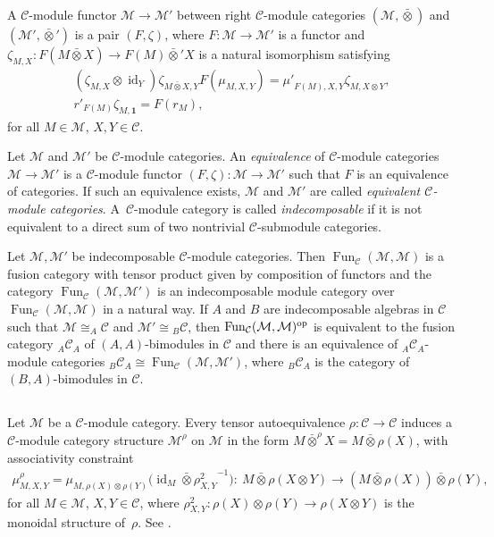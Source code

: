 \documentclass[pdftex]{sigma}
\numberwithin{equation}{section}
\newcommand{\oot}{\bar\otimes}
\newcommand{\C}{{\mathcal C}}
\newcommand{\M}{{\mathcal M}}
\newcommand{\1}{\textbf{1}}
\newcommand\id{\operatorname{id}}
\begin{document}
A $\C$-module functor $\M \to \M'$ between right $\C$-module categories $(\M, \oot)$ and $(\M', \oot')$ is a pair $(F, \zeta)$, where $F\colon \M\to \M'$ is a functor and $\zeta_{M, X}\colon F(M \oot X) \to F(M) \oot' X$ is a natural isomorphism satisfying
\begin{gather}\label{uno-z} (\zeta_{M, X} \otimes \id_Y ) \zeta_{M \oot X, Y} F(\mu_{M, X, Y}) = {\mu'}_{F(M), X, Y} \zeta_{M, X \otimes Y},\\
\label{dos-z} {r'}_{F(M)} \zeta_{M, \1} = F(r_M),
\end{gather}
for all $M \in \M$, $X, Y \in \C$.

Let $\M$ and $\M'$ be $\C$-module categories. An \emph{equivalence} of $\C$-module categories $\M \to \M'$ is a $\C$-module functor $(F, \zeta)\colon \M\to \M'$ such that $F$ is an equivalence of categories. If such an equivalence exists, $\M$ and $\M'$ are called \emph{equivalent $\C$-module categories}. A~$\C$-module category is called \emph{indecomposable} if it is not equivalent to a direct sum of two nontrivial $\mathcal{C}$-submodule categories.

Let $\M, \M'$ be indecomposable $\C$-module categories. Then $\operatorname{Fun}_\C(\M, \M)$ is a fusion category with tensor product given by composition of functors and the category $\operatorname{Fun}_\C(\M, \M')$ is an indecomposable module category over $\operatorname{Fun}_\C(\M, \M)$ in a natural way. If $A$ and $B$ are indecomposable algebras in $\C$ such that $\M \cong _A\!\C$ and $\M' \cong {}_B\C$, then $\operatorname{Fun}_\C(\M, \M)^{\rm op}$ is equivalent to the fusion category $_A\C_A$ of $(A, A)$-bimodules in $\C$ and there is an equivalence of $_A\C_A$-module categories $_B\C_A \cong \operatorname{Fun}_\C(\M, \M')$, where $_B\C_A$ is the category of $(B, A)$-bimodules in $\C$.

\subsection{}\label{action-mc} Let $\M$ be a $\C$-module category. Every tensor autoequivalence $\rho\colon \C \to \C$ induces a $\C$-module category structure $\M^\rho$ on $\M$ in the form $M \oot^\rho X = M\oot \rho(X)$, with associativity constraint
\begin{gather*}\mu^\rho_{M, X, Y} = \mu_{M, \rho(X) \otimes \rho(Y)} \big(\id_M \oot {\rho^2_{X, Y}}^{-1}\big)\colon \ M \oot \rho(X\otimes Y) \to (M\oot \rho(X)) \oot \rho(Y),\end{gather*} for all $M \in \M$, $X, Y \in \C$, where $\rho^2_{X, Y}\colon \rho(X) \otimes \rho(Y) \to \rho(X \otimes Y)$ is the monoidal structure of~$\rho$. See \cite[Section~3.2]{nikshych}.
\end{document}
